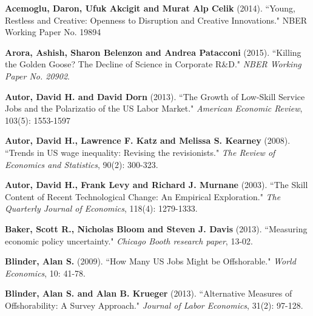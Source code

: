 \documentclass[11pt,a4paper]{article}
\begin{document}
\newpage
\vspace*{0.5cm}
\begin{thebibliography}{9}
	
	 \textbf{Acemoglu, Daron, Ufuk Akcigit and Murat Alp Celik} (2014). ``Young, Restless and Creative: Openness to Disruption and Creative Innovations." NBER Working Paper No. 19894

	 \textbf{Arora, Ashish, Sharon Belenzon and Andrea Patacconi} (2015). ``Killing the Golden Goose? The Decline of Science in Corporate R\&D." \textit{NBER Working Paper No. 20902}.
	
	 \textbf{Autor, David H. and David Dorn} (2013). ``The Growth of Low-Skill Service Jobs and the Polarizatio of the US Labor Market." \textit{American Economic Review}, 103(5): 1553-1597
	
	 \textbf{Autor, David H., Lawrence F. Katz and Melissa S. Kearney} (2008). ``Trends in US wage inequality: Revising the revisionists." \textit{The Review of Economics and Statistics}, 90(2): 300-323.
	
	 \textbf{Autor, David H., Frank Levy and Richard J. Murnane} (2003). ``The Skill Content of Recent Technological Change: An Empirical Exploration." \textit{The Quarterly Journal of Economics}, 118(4): 1279-1333.
	
	 \textbf{Baker, Scott R., Nicholas Bloom and Steven J. Davis} (2013). ``Measuring economic policy uncertainty." \textit{Chicago Booth research paper}, 13-02.
	
	
	 \textbf{Blinder, Alan S.} (2009). ``How Many US Jobs Might be Offshorable." \textit{World Economics}, 10: 41-78.
	
	 \textbf{Blinder, Alan S. and Alan B. Krueger} (2013). ``Alternative Measures of Offshorability: A Survey Approach." \textit{Journal of Labor Economics}, 31(2): 97-128.
	

\end{thebibliography}
\end{document}
